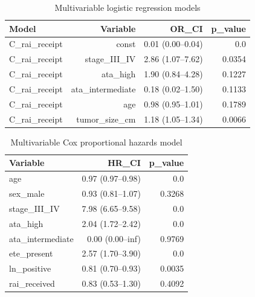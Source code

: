 \begin{table}[htbp]
\centering
\caption{Multivariable logistic regression models}
\label{tab:logistic_models}
\begin{tabular}{lrrr}
\toprule
Model & Variable & OR\_CI & p\_value \\
\midrule
C\_rai\_receipt & const & 0.01 (0.00--0.04) & 0.0 \\
C\_rai\_receipt & stage\_III\_IV & 2.86 (1.07--7.62) & 0.0354 \\
C\_rai\_receipt & ata\_high & 1.90 (0.84--4.28) & 0.1227 \\
C\_rai\_receipt & ata\_intermediate & 0.18 (0.02--1.50) & 0.1133 \\
C\_rai\_receipt & age & 0.98 (0.95--1.01) & 0.1789 \\
C\_rai\_receipt & tumor\_size\_cm & 1.18 (1.05--1.34) & 0.0066 \\
\bottomrule
\end{tabular}
\end{table}

\begin{table}[htbp]
\centering
\caption{Multivariable Cox proportional hazards model}
\label{tab:cox_ph}
\begin{tabular}{lrr}
\toprule
Variable & HR\_CI & p\_value \\
\midrule
age & 0.97 (0.97--0.98) & 0.0 \\
sex\_male & 0.93 (0.81--1.07) & 0.3268 \\
stage\_III\_IV & 7.98 (6.65--9.58) & 0.0 \\
ata\_high & 2.04 (1.72--2.42) & 0.0 \\
ata\_intermediate & 0.00 (0.00--inf) & 0.9769 \\
ete\_present & 2.57 (1.70--3.90) & 0.0 \\
ln\_positive & 0.81 (0.70--0.93) & 0.0035 \\
rai\_received & 0.83 (0.53--1.30) & 0.4092 \\
\bottomrule
\end{tabular}
\end{table}